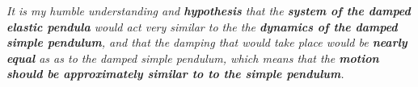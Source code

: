 
\textit{It is my humble understanding and \textbf{hypothesis} that the \textbf{system of the damped elastic pendula} would act very similar to the the \textbf{dynamics of the damped simple pendulum}, and that the damping that would take place would be \textbf{nearly equal} as as to the damped simple pendulum, which means that the \textbf{motion should be approximately similar to to the simple pendulum}.}


